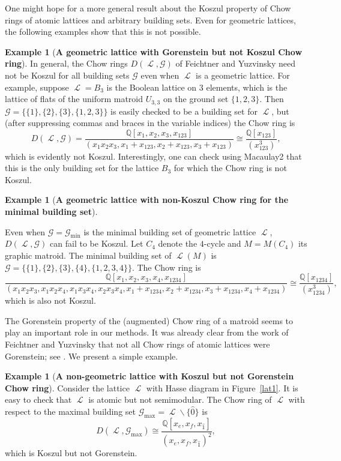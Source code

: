 \documentclass[11pt, reqno]{amsart}
\renewcommand{\hat}[1]{\widehat{#1}}
\newcommand{\iso}{\cong}
\DeclareMathOperator{\LL}{\mathcal{L}}
\newcommand{\QQ}{\mathbb{Q}}
\renewcommand{\setminus}{\smallsetminus}
\theoremstyle{definition}
\newtheorem{example}[thm]{Example}
\numberwithin{equation}{section}
\numberwithin{table}{section}
\begin{document}
\begin{spacing}{1.1}
One might hope for a more general result about the Koszul property of Chow rings of atomic lattices and arbitrary building sets.  Even for geometric lattices, the following examples show that this is not possible.

\begin{example}[\textbf{A geometric lattice with Gorenstein but not Koszul Chow ring}] \label{nonKoszul:building:set}
In general, the Chow rings $D(\LL, \mathcal{G})$ of Feichtner and Yuzvinsky need not be Koszul for all building sets $\mathcal{G}$ even when $\LL$ is a geometric lattice.  For example, suppose $\LL = B_3$ is the Boolean lattice on 3 elements, which is the lattice of flats of the uniform matroid $U_{3,3}$ on the ground set $\{1, 2, 3\}$.  Then $\mathcal{G} = \{\{1\}, \{2\}, \{3\}, \{1, 2, 3\}\}$ is easily checked to be a building set for $\LL$, but (after suppressing commas and braces in the variable indices) the Chow ring is
\[ 
D(\LL, \mathcal{G}) = \frac{\QQ[x_1, x_2, x_3, x_{123}]}{(x_1x_2x_3, x_1 + x_{123}, x_2 + x_{123}, x_3 + x_{123})} 
\iso
\frac{\QQ[x_{123}]}{(x_{123}^3)},
\]
which is evidently not Koszul.  Interestingly, one can check using Macaulay2 that this is the only building set for the lattice $B_3$ for which the Chow ring is not Koszul.
\end{example}

\begin{example}[\textbf{A geometric lattice with non-Koszul Chow ring for the minimal building set}] \label{nonKoszulminimalbuildingset}

Even when $\mathcal{G} = \mathcal{G}_{\min}$ is the minimal building set of geometric lattice $\LL$, $D(\LL,\mathcal{G})$ can fail to be Koszul.  Let $C_4$ denote the $4$-cycle and $M = M(C_4)$ its graphic matroid.  The minimal building set of $\LL(M)$ is $\mathcal{G} = \{\{1\},\{2\},\{3\},\{4\},\{1,2,3,4\}\}$.  The Chow ring is
\[ 
\frac{\QQ[x_1, x_2,x_3,x_4, x_{1234}]}{(x_1x_2x_3, x_1x_2x_4,x_1x_3x_4, x_2x_3x_4, x_1 + x_{1234}, x_2 + x_{1234}, x_3 + x_{1234},x_4 + x_{1234})} 
\iso
\frac{\QQ[x_{1234}]}{(x_{1234}^3)},
\]
which is also not Koszul.
\end{example}

The Gorenstein property of the (augmented) Chow ring of a matroid seems to play an important role in our methods.  It was already clear from the work of Feichtner and Yuzvinsky that not all Chow rings of atomic lattices were Gorenstein; see \cite[pp. 22-23]{FY04}.  We present a simple example.

\begin{example}[\textbf{A non-geometric lattice with Koszul but not Gorenstein Chow ring}]
 Consider the lattice $\LL$ with Hasse diagram in Figure~\ref{lat1}.  It is easy to check that $\LL$ is atomic but not semimodular.  The Chow ring of $\LL$  with respect to the maximal building set $\mathcal{G}_{\max} = \LL \setminus \{\hat{0}\}$ is
\[ 
D(\LL,\mathcal{G}_{\max}) \iso \frac{\QQ[x_e, x_f, x_{\hat{1}}]}{(x_e, x_f, x_{\hat{1}})^2},
\]
which is Koszul but not Gorenstein.


\end{example}
\end{spacing}
\end{document}
